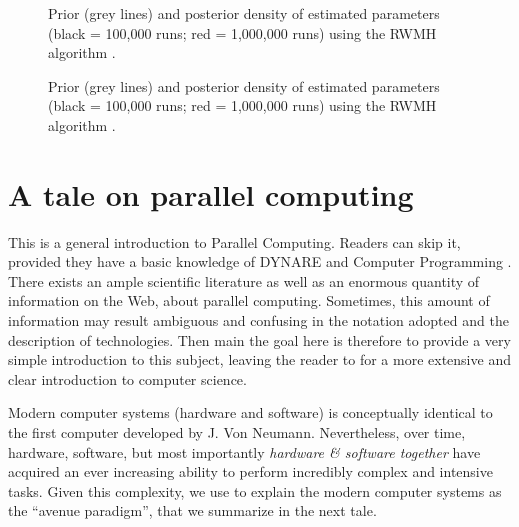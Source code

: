 \documentclass[12pt,a4paper,pdftex]{article}
\begin{document}
\begin{figure}
\begin{centering}
  \epsfxsize=300pt 
  \caption{Prior (grey lines) and posterior density of estimated parameters (black = 100,000 runs; red = 1,000,000 runs) using the RWMH algorithm \citep[QUEST III model][]{Ratto_et_al_EconModel2009}.}\label{fig:quest_RWMH_comp6}
\end{centering}
\end{figure}
\begin{figure}
\begin{centering}
  \epsfxsize=300pt 
  \caption{Prior (grey lines) and posterior density of estimated parameters (black = 100,000 runs; red = 1,000,000 runs) using the RWMH algorithm \citep[QUEST III model][]{Ratto_et_al_EconModel2009}.}\label{fig:quest_RWMH_comp7}
\end{centering}
\end{figure}

\clearpage
\newpage

\appendix
\section{A tale on parallel computing}
This is a general introduction to Parallel Computing. Readers can skip it, provided they have a basic knowledge of DYNARE and Computer Programming \citep{GoffeCreel_Grid_2008,Azzini_etal_DYNARE_2007,ParallelDYNARE}.
There exists an ample scientific literature as well as an enormous quantity of information on the Web, about parallel computing. Sometimes, this amount of information may result ambiguous and confusing in the notation adopted and the description of technologies.  Then main the goal here is therefore to provide a very simple introduction to this subject, leaving the reader to \cite{Brookshear} for a more extensive and clear introduction to computer science.

Modern computer systems (hardware and software) is conceptually identical to the first computer developed by J. Von Neumann. Nevertheless, over time, hardware, software, but most importantly \emph{hardware \& software together} have acquired an ever increasing ability to perform incredibly complex and intensive tasks. Given this complexity, we use to explain the modern computer systems as the ``avenue paradigm'', that we summarize in the next tale.
\end{document}
